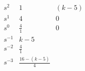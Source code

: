 \[
\begin{array}{c|cc}
s^2 & 1 & (k-5) \\
s^1 & 4 & 0 \\
s^0 & \frac{4}{1} & 0 \\
s^{-1} & k - 5 &  \\
s^{-2} & \frac{4}{1} &  \\
s^{-3} & \frac{16 - (k - 5)}{4} & \\
\end{array}
\]
